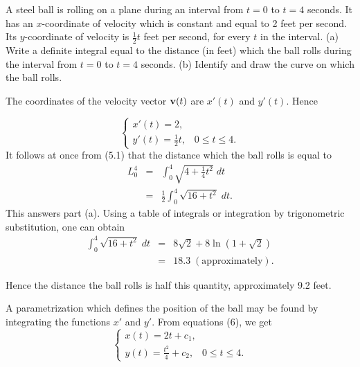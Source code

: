 \begin{example} A steel ball is rolling on a plane during an interval from $t = 0$ to $t = 4$ seconds. It has an $x$-coordinate of velocity which is constant and equal to 2 feet per second. Its $y$-coordinate of velocity is $\frac{1}{2}t$ feet per second, for every $t$ in the interval. (a) Write a definite integral equal to the distance (in feet) which the ball rolls during the interval from $t = 0$ to $t = 4$ seconds. (b) Identify and draw the curve on which the ball rolls.

The coordinates of the velocity vector $\mbox{\bf{v}}(t)$ are $x'(t)$ and $y'(t)$. Hence 

\begin{equation}
\left \{ \begin{array}{l}
x'(t) = 2, \\
y'(t) = \frac{1}{2} t,  \;\;\; 0 \leq t \leq 4.   
\end{array}
\right .
\end{equation}
It follows at once from (5.1) that the distance which the ball rolls is equal to
\begin{eqnarray*}
L_0^4 &=& \int_0^4 \sqrt{4 + \frac{1}{4} t^2} \;dt \\
           &=& \frac{1}{2} \int_0^4 \sqrt{16 + t^2} \;dt.
\end{eqnarray*}
This answers part (a). Using a table of integrals or integration by trigonometric substitution, one can obtain
\begin{eqnarray*}
\int_0^4 \sqrt{16 + t^2} \;dt &=& 8 \sqrt 2 + 8 \ln (1 + \sqrt 2) \\
                                         &=& 18.3 \;\mathrm{(approximately).}
\end{eqnarray*}

Hence the distance the ball rolls is half this quantity, approximately 9.2 feet.
\end{example}

A parametrization which defines the position of the ball may be found by integrating the functions $x'$ and $y'$. From equations (6), we get
$$
\left \{ \begin{array}{l}
x(t) = 2t + c_1,\\
y(t) = \frac{t^2}{4} + c_2, \;\;\; 0 \leq t \leq 4.
\end{array}
\right .
$$

